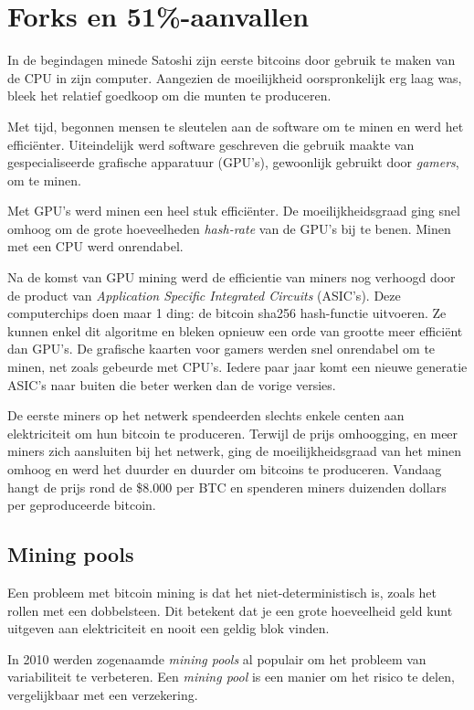 

\chapter{Forks en 51\%-aanvallen}
In de begindagen minede Satoshi zijn eerste bitcoins door gebruik te maken van de CPU in zijn computer. Aangezien de moeilijkheid oorspronkelijk erg laag was, bleek het relatief goedkoop om die munten te produceren.

Met tijd, begonnen mensen te sleutelen aan de software om te minen en werd het efficiënter. Uiteindelijk werd software geschreven die gebruik maakte van gespecialiseerde grafische apparatuur (GPU’s), gewoonlijk gebruikt door \textit{gamers}, om te minen.

Met GPU’s werd minen een heel stuk efficiënter. De moeilijkheidsgraad ging snel omhoog om de grote hoeveelheden \textit{hash-rate} van de GPU’s bij te benen. Minen met een CPU werd onrendabel.

Na de komst van GPU mining werd de efficientie van miners nog verhoogd door de product van \textit{Application Specific Integrated Circuits} (ASIC’s). Deze computerchips doen maar 1 ding: de bitcoin sha256 hash-functie uitvoeren. Ze kunnen enkel dit algoritme en bleken opnieuw een orde van grootte meer efficiënt dan GPU’s. De grafische kaarten voor gamers werden snel onrendabel om te minen, net zoals gebeurde met CPU’s. Iedere paar jaar komt een nieuwe generatie ASIC’s naar buiten die beter werken dan de vorige versies.

De eerste miners op het netwerk spendeerden slechts enkele centen aan elektriciteit om hun bitcoin te produceren. Terwijl de prijs omhoogging, en meer miners zich aansluiten bij het netwerk, ging de moeilijkheidsgraad van het minen omhoog en werd het duurder en duurder om bitcoins te produceren. Vandaag hangt de prijs rond de \$8.000 per BTC en spenderen miners duizenden dollars per geproduceerde bitcoin.

\section{Mining pools}
Een probleem met bitcoin mining is dat het niet-deterministisch is, zoals het rollen met een dobbelsteen. Dit betekent dat je een grote hoeveelheid geld kunt uitgeven aan elektriciteit en nooit een geldig blok vinden.

In 2010 werden zogenaamde \textit{mining pools} al populair om het probleem van variabiliteit te verbeteren. Een \textit{mining pool} is een manier om het risico te delen, vergelijkbaar met een verzekering.


